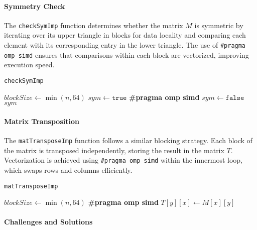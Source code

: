 \documentclass[conference]{IEEEtran}
\begin{document}
\paragraph{Symmetry Check} 
The \texttt{checkSymImp} function determines whether the matrix \( M \) is symmetric by iterating over its upper triangle in blocks for data locality and comparing each element with its corresponding entry in the lower triangle.
The use of \texttt{\#pragma omp simd} ensures that comparisons within each block are vectorized, improving execution speed.
\begin{algorithm}
\caption{\texttt{checkSymImp}}
\begin{algorithmic}[1]
\State $blockSize \gets \min(n, 64)$
\State $sym \gets \texttt{true}$
            \State \textbf{\#pragma omp simd}
                    \State $sym \gets \texttt{false}$
                \EndIf
            \EndFor
        \EndFor
    \EndFor
\EndFor
\State \Return $sym$
\end{algorithmic}
\end{algorithm}
\paragraph{Matrix Transposition} 
The \texttt{matTransposeImp} function follows a similar blocking strategy. Each block of the matrix is transposed independently, storing the result in the matrix \( T \). Vectorization is achieved using \texttt{\#pragma omp simd} within the innermost loop, which swaps rows and columns efficiently.
\begin{algorithm}
\caption{\texttt{matTransposeImp}}
\begin{algorithmic}[1]
\State $blockSize \gets \min(n, 64)$
            \State \textbf{\#pragma omp simd}
                \State $T[y][x] \gets M[x][y]$
            \EndFor
        \EndFor
    \EndFor
\EndFor
\end{algorithmic}
\end{algorithm}

\paragraph{Challenges and Solutions}  
\end{document}
